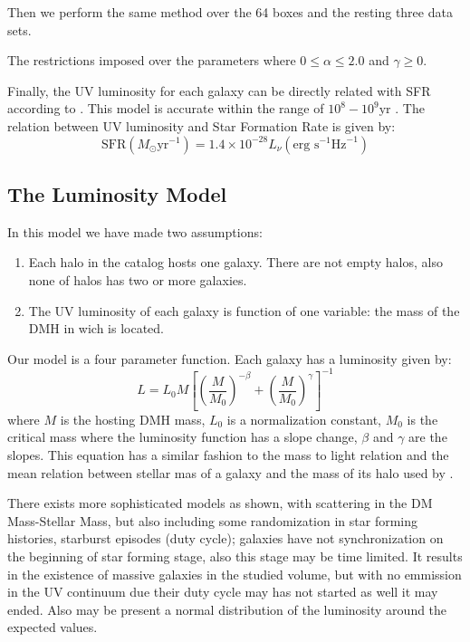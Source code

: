 \documentclass{emulateapj}
\begin{document}
Then we perform the same method over the 64 boxes and the resting three data sets.

The restrictions imposed over the parameters where $0 \leq \alpha \leq 2.0 $  and 
$\gamma \geq 0$.


Finally, the UV luminosity for each galaxy can be directly related with SFR according 
to \citet{Madau98}.
This model is accurate within the range of $10^8 - 10^9 \textrm{yr}$
\citep{Kennicutt98}. The relation between UV luminosity and Star Formation Rate 
is given by:
\begin{equation}
 \textrm{SFR}\left(M_\odot \textrm{yr}^{-1}\right) 
      = 1.4 \times 10^{-28} L_{\nu} \left( \textrm{erg s}^{-1}\textrm{Hz}^{-1} 
	\right)
\end{equation}

\subsection{The Luminosity Model}

In this model we have made two assumptions:
\begin{enumerate}
 \item Each halo in the catalog hosts one galaxy. There are not empty
halos, also none of halos has two or more galaxies.
 \item The UV luminosity of each galaxy is function of one variable: the mass of
the DMH in wich is located.
\end{enumerate}
Our model is a four parameter function. Each galaxy has a luminosity given
by:
  \begin{equation}
  L = L_{0} M \left[ \left( \frac{M}{M_0}\right)^{-\beta} 
		   + \left( \frac{M}{M_0}\right)^{\gamma} 
               \right]^{-1}
  \end{equation}
where $M$ is the hosting DMH mass, $L_{0}$ is a normalization constant, $M_0$
is the critical mass where the luminosity function has a slope change, 
$\beta$ and $\gamma$ are the slopes. This equation has a similar fashion to the
mass to light relation \citep{vandenBosch03} and the mean relation between
stellar mas of a galaxy and the mass of its halo used by \cite{Moster10}.

There exists more sophisticated models as \cite{Lee09} shown, with scattering in 
the DM Mass-Stellar Mass, but also including some 
randomization in star forming histories, starburst episodes (duty cycle); 
galaxies have not synchronization on the beginning of star forming stage, also
this stage may be time limited. It results in the existence of massive galaxies
in the studied volume, but with no emmission in the UV continuum due their
duty cycle may has not started as well it may ended. Also may be present a
normal distribution of the luminosity around the expected values.
\end{document}
